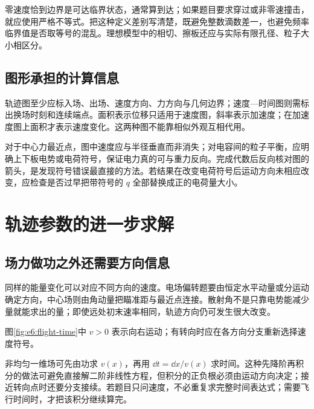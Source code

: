 零速度恰到边界是可达临界状态，通常算到达；如果题目要求穿过或非零速撞击，就应使用严格不等式。把这种定义差别写清楚，既避免整数滴数差一，也避免频率临界值是否取等号的混乱。理想模型中的相切、擦板还应与实际有限孔径、粒子大小相区分。

\subsection{图形承担的计算信息}

轨迹图至少应标入场、出场、速度方向、力方向与几何边界；速度—时间图则需标出换场时刻和连续端点。面积表示位移只适用于速度图，斜率表示加速度；在加速度图上面积才表示速度变化。这两种图不能靠相似外观互相代用。

对于中心力最近点，图中速度应与半径垂直而非消失；对电容间的粒子平衡，应明确上下板电势或电荷符号，保证电力真的可与重力反向。完成代数后反向核对图的箭头，是发现符号错误最直接的方法。若结果在改变电荷符号后运动方向未相应改变，应检查是否过早把带符号的 $q$ 全部替换成正的电荷量大小。


\section{轨迹参数的进一步求解}
\subsection{场力做功之外还需要方向信息}

同样的能量变化可以对应不同方向的速度。电场偏转题要由恒定水平动量或分运动确定方向，中心场则由角动量把瞄准距与最近点连接。散射角不是只靠电势能减少量就能求出的量；即使远处初末速率相同，轨迹方向仍可发生很大改变。

\par 图\ref{fig:e6:flight-time}中 $v>0$ 表示向右运动；有转向时应在各方向分支重新选择速度符号。

非均匀一维场可先由功求 $v(x)$，再用 $\dd t=\dd x/v(x)$ 求时间。这种先降阶再积分的做法可避免直接解二阶非线性方程，但积分的正负根必须由运动方向决定；接近转向点时还要分支接续。若题目只问速度，不必重复求完整时间表达式；需要飞行时间时，才把该积分继续算完。


